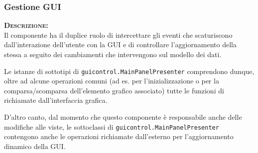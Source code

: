 \subsubsection{Gestione GUI}
\begin{description}
	\item{\scshape\bfseries Descrizione:}\\
Il componente ha il duplice ruolo di intercettare gli eventi che scaturiscono dall'interazione dell'utente con la GUI e di controllare l'aggiornamento della stessa a seguito dei cambiamenti che intervengono sul modello dei dati.

Le istanze di sottotipi di \texttt{guicontrol.MainPanelPresenter} comprendono dunque, oltre ad alcune operazioni comuni (ad es. per l'inizializzazione o per la comparsa/scomparsa dell'elemento grafico associato) tutte le funzioni di  richiamate dall'interfaccia grafica.

D'altro canto, dal momento che questo componente è responsabile anche delle modifiche alle viste, le sottoclassi di \texttt{guicontrol.MainPanelPresenter} contengono anche le operazioni richiamate dall'esterno per l'aggiornamento dinamico della GUI.


\end{description}
